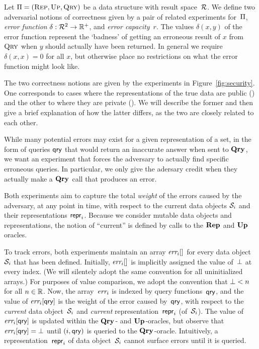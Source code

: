 


Let $\mathrm{\Pi}=(\textnormal{\textsc{Rep}},\textnormal{\textsc{Up}},\textnormal{\textsc{Qry}})$ be a data structure with result space~$\mathcal{R}$.
%
We define two adversarial notions of correctness given by a pair of related
experiments for~$\mathrm{\Pi}$, \emph{error function} $\delta:\mathcal{R}^2 \to \mathbb{R}^+$,
and \emph{error capacity}~$r$. The values $\delta(x,y)$ of the error function represent
the `badness' of getting an erroneous result of $x$ from $\textnormal{\textsc{Qry}}$ when $y$ should
actually have been returned. In general we require $\delta(x,x) = 0$ for all
$x$, but otherwise place no restrictions on what the error function might look
like.

The two correctness notions are given by the experiments in
Figure~\ref{fig:security}. One corresponds to cases where the representations of
the true data are public (\errep) and the other to where they are private
(\erreps). We will describe the former and then give a brief explanation of how
the latter differs, as the two are closely related to each other.

While many potential errors may exist for a given representation of a set, in
the form of queries $\mathsf{qry}$ that would return an inaccurate answer when sent to
$\textup{\textbf{Qry}}\hspace{0.5pt}$, we want an experiment that forces the adversary to actually find
specific erroneous queries. In particular, we only give the adersary credit when
they actually make a $\textup{\textbf{Qry}}\hspace{0.5pt}$ call that produces an error.

Both experiments aim to capture the total \emph{weight} of the errors caused by the
adversary, at any point in time, with respect to the current data objects
$\mathcal{S}_i$ and their representations $\mathsf{repr}_i$.  Because we consider mutable data
objects and representations, the notion of ``current'' is defined by calls to
the $\textup{\textbf{Rep}}\hspace{0.5pt}$ and $\textup{\textbf{Up}}\hspace{0.5pt}$ oracles.

To track errors, both experiments maintain an array $\textit{err}_i[]$ for every data
object~$\mathcal{S}_i$ that has been defined.  Initially, $\textit{err}_i[]$ is implicitly
assigned the value of~$\bot$ at every index. (We will silentely adopt the
same convention for all uninitialized arrays.) For purposes of value
comparison, we adopt the convention that $\bot < n$ for all $n \in \mathbb{R}$.
%
Now, the array~$\textit{err}_i$ is indexed by query functions~$\mathsf{qry}$, and the value of
$\textit{err}_i[\mathsf{qry}]$ is the weight of the error caused by~$\mathsf{qry}$, with respect to
the \emph{current} data object~$\mathcal{S}_i$ and \emph{current}
representation~$\mathsf{repr}_i$ (of~$\mathcal{S}_i$).
%
The value of~$\textit{err}_i[\mathsf{qry}]$ is updated within the $\textup{\textbf{Qry}}\hspace{0.5pt}$- and $\textup{\textbf{Up}}\hspace{0.5pt}$-oracles,
but observe that $\textit{err}_i[\mathsf{qry}] = \bot$ until $(i,\mathsf{qry})$ is queried to the
$\textup{\textbf{Qry}}\hspace{0.5pt}$-oracle.  Intuitively, a representation~$\mathsf{repr}_i$ of data object~$\mathcal{S}_i$
cannot surface errors until it is queried.

